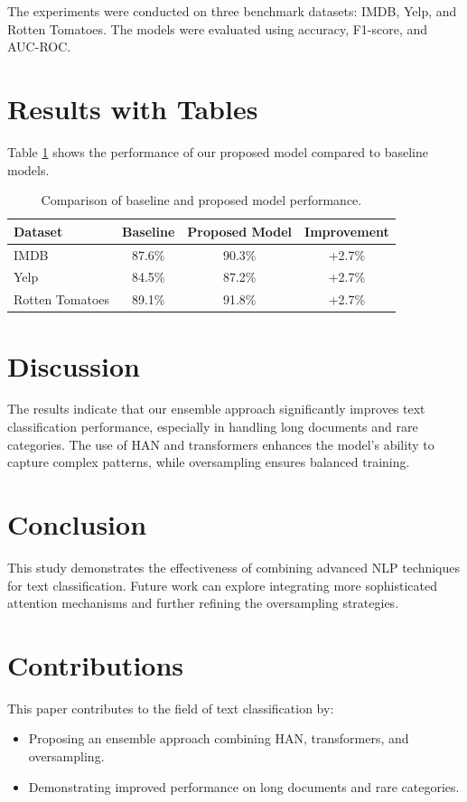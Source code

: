 \documentclass{article}
\begin{document}
The experiments were conducted on three benchmark datasets: IMDB, Yelp, and Rotten Tomatoes. The models were evaluated using accuracy, F1-score, and AUC-ROC.

\section{Results with Tables}
Table \ref{tab:results} shows the performance of our proposed model compared to baseline models.

\begin{table}[ht]
    \centering
    \begin{tabular}{l|ccc}
        \toprule
        Dataset & Baseline & Proposed Model & Improvement \\
        \midrule
        IMDB & 87.6\% & 90.3\% & +2.7\% \\
        Yelp & 84.5\% & 87.2\% & +2.7\% \\
        Rotten Tomatoes & 89.1\% & 91.8\% & +2.7\% \\
        \bottomrule
    \end{tabular}
    \caption{Comparison of baseline and proposed model performance.}
    \label{tab:results}
\end{table}

\section{Discussion}
The results indicate that our ensemble approach significantly improves text classification performance, especially in handling long documents and rare categories. The use of HAN and transformers enhances the model's ability to capture complex patterns, while oversampling ensures balanced training.

\section{Conclusion}
This study demonstrates the effectiveness of combining advanced NLP techniques for text classification. Future work can explore integrating more sophisticated attention mechanisms and further refining the oversampling strategies.

\section{Contributions}
This paper contributes to the field of text classification by:
\begin{itemize}
    \item Proposing an ensemble approach combining HAN, transformers, and oversampling.
    \item Demonstrating improved performance on long documents and rare categories.
\end{itemize}



\end{document}
